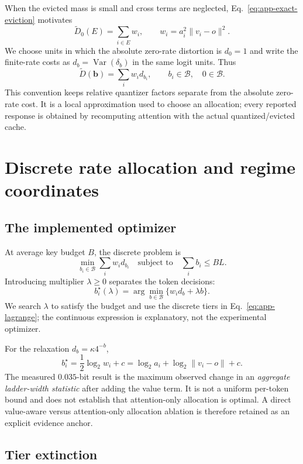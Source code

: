 When the evicted mass is small and cross terms are neglected,
Eq.~\eqref{eq:app-exact-eviction} motivates
\[
 \widetilde D_0(E)=\sum_{i\in E} w_i,
 \qquad
 w_i=a_i^2\|v_i-o\|^2.
\]
We choose units in which the absolute zero-rate distortion is $d_0=1$ and write
the finite-rate costs as $d_b=\operatorname{Var}(\delta_b)$ in the same logit
units.  Thus
\[
 \widetilde D(\mathbf b)=\sum_i w_i d_{b_i},
 \qquad b_i\in\mathcal B,\quad 0\in\mathcal B.
\]
This convention keeps relative quantizer factors separate from the absolute zero-rate
cost.  It is a local approximation used to choose an allocation; every
reported response is obtained by recomputing attention with the actual
quantized/evicted cache.

\section{Discrete rate allocation and regime coordinates}
\label{app:allocation}

\subsection{The implemented optimizer}

At average key budget $B$, the discrete problem is
\begin{equation}
 \min_{b_i\in\mathcal B}\sum_i w_i d_{b_i}
 \quad\text{subject to}\quad
 \sum_i b_i\le BL.
 \label{eq:app-discrete}
\end{equation}
Introducing multiplier $\lambda\ge0$ separates the token decisions:
\begin{equation}
 b_i^\star(\lambda)
 =\arg\min_{b\in\mathcal B}\{w_i d_b+\lambda b\}.
 \label{eq:app-lagrange}
\end{equation}
We search $\lambda$ to satisfy the budget and use the discrete tiers in
Eq.~\eqref{eq:app-lagrange}; the continuous expression is explanatory, not the
experimental optimizer.

For the relaxation $d_b=\kappa 4^{-b}$,
\[
 b_i^\star
 =\frac12\log_2w_i+c
 =\log_2a_i+\log_2\|v_i-o\|+c.
\]
The measured $0.035$-bit result is the maximum observed change in an
\emph{aggregate ladder-width statistic} after adding the value term.  It is not
a uniform per-token bound and does not establish that attention-only allocation
is optimal.  A direct value-aware versus attention-only allocation ablation is
therefore retained as an explicit evidence anchor.

\subsection{Tier extinction}

